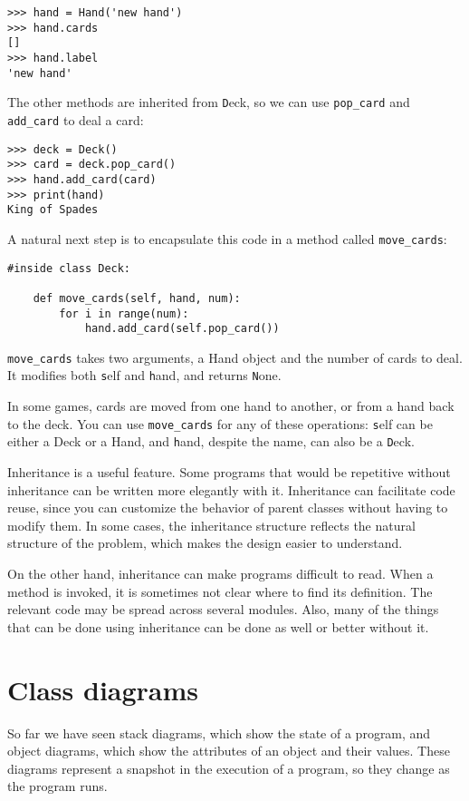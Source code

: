 \documentclass[
DIV=11,
fontsize=12,
twoside,
headinclude=false,
titlepage=firstiscover,
abstract=true,
headsepline=true,
footsepline=true,
chapterprefix=true, %
headings=big,
bibliography=totoc,%
captions=tableheading
]{scrbook}
\theoremstyle{definition}
\begin{document}
\begin{lstlisting}
>>> hand = Hand('new hand')
>>> hand.cards
[]
>>> hand.label
'new hand'
\end{lstlisting}
%
The other methods are inherited from {\texttt Deck}, so we can use
\verb"pop_card" and \verb"add_card" to deal a card:

\begin{lstlisting}
>>> deck = Deck()
>>> card = deck.pop_card()
>>> hand.add_card(card)
>>> print(hand)
King of Spades
\end{lstlisting}
%
A natural next step is to encapsulate this code in a method
called \verb"move_cards":

\begin{lstlisting}
#inside class Deck:

    def move_cards(self, hand, num):
        for i in range(num):
            hand.add_card(self.pop_card())
\end{lstlisting}
%
\verb"move_cards" takes two arguments, a Hand object and the number of
cards to deal.  It modifies both {\texttt self} and {\texttt hand}, and
returns {\texttt None}.

In some games, cards are moved from one hand to another,
or from a hand back to the deck.  You can use \verb"move_cards"
for any of these operations: {\texttt self} can be either a Deck
or a Hand, and {\texttt hand}, despite the name, can also be a {\texttt Deck}.

Inheritance is a useful feature.  Some programs that would be
repetitive without inheritance can be written more elegantly
with it.  Inheritance can facilitate code reuse, since you can
customize the behavior of parent classes without having to modify
them.  In some cases, the inheritance structure reflects the natural
structure of the problem, which makes the design easier to
understand.

On the other hand, inheritance can make programs difficult to read.
When a method is invoked, it is sometimes not clear where to find its
definition.  The relevant code may be spread across several modules.
Also, many of the things that can be done using inheritance can be
done as well or better without it.


\section{Class diagrams}
\label{class.diagram}

So far we have seen stack diagrams, which show the state of
a program, and object diagrams, which show the attributes
of an object and their values.  These diagrams represent a snapshot
in the execution of a program, so they change as the program
runs.
\end{document}
